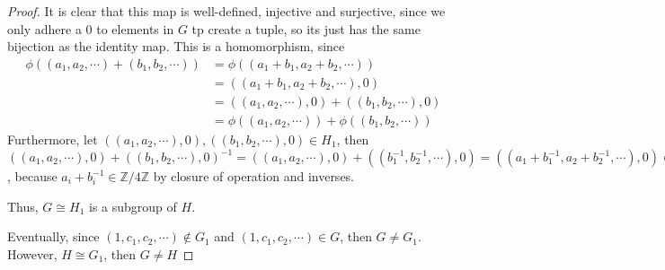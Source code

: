 \begin{answer}
\begin{proof}
        It is clear that this map is well-defined, injective and surjective, since we only adhere a $0$ to elements in $G$ tp create a tuple, so its just has the same bijection as the identity map. This is a homomorphism, since
        \begin{equation}
            \begin{aligned}
                \phi((a_1,a_2,\cdots) + (b_1,b_2,\cdots)) &= \phi((a_1+b_1,a_2+b_2,\cdots))\\
                &= ((a_1+b_1,a_2+b_2,\cdots),0)\\
                &= ((a_1,a_2,\cdots),0) + ((b_1,b_2,\cdots),0)\\
                &= \phi((a_1,a_2,\cdots)) + \phi((b_1,b_2,\cdots))
            \end{aligned}
        \end{equation}
        Furthermore, let $((a_1,a_2,\cdots),0), ((b_1,b_2,\cdots),0) \in H_1$, then $((a_1,a_2,\cdots),0) + ((b_1,b_2,\cdots),0)^{-1} = ((a_1,a_2,\cdots),0) + ((b_1^{-1},b_2^{-1},\cdots),0) = ((a_1+b_1^{-1},a_2+b_2^{-1},\cdots),0) \in H_1$, because $a_i+b_i^{-1} \in \mathbb{Z}/4\mathbb{Z}$ by closure of operation and inverses.
        
        Thus, $G \cong H_1$ is a subgroup of $H$.
        
        Eventually, since $(1,c_1,c_2,\cdots) \notin G_1$ and $(1,c_1,c_2,\cdots) \in G$, then $G \neq G_1$. However, $H \cong G_1$, then $G \neq H$ 
    \end{proof} 
\end{answer}